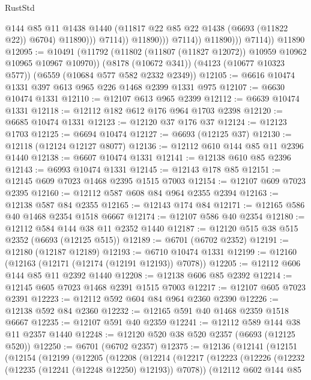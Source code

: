 \begin{lexlean}{RustStd}
\begin{coremodule}
                                  @144
                                  @85
                                  @11
                                  @1438
                                  @1440
                                  (@11817 @22 @85 @22 @1438 (@6693 (@11822 @22)) @6704)
                                  @11890)))
                            @7114))
                        @11890)))
                  @7114))
              @11890)))
        @7114))
    @11890
@12095 := @10491
    (@11792 (@11802 (@11807 (@11827 @12072)) @10959 @10962 @10965 @10967 @10970))
    (@8178 (@10672 @341))
    (@4123 (@10677 @10323 @577))
    (@6559 (@10684 @577 @582 @2332 @2349))
@12105 := @6616 @10474 @1331 @397 @613 @965 @226 @1468 @2399 @1331 @975
@12107 := @6630 @10474 @1331
@12110 := @12107 @613 @965 @2399
@12112 := @6639 @10474 @1331
@12118 := @12112 @182 @612 @176 @964 @1703 @2398
@12120 := @6685 @10474 @1331
@12123 := @12120 @37 @176 @37
@12124 := @12123 @1703
@12125 := @6694 @10474
@12127 := @6693 (@12125 @37)
@12130 := @12118 (@12124 @12127 @8077)
@12136 := @12112 @610 @144 @85 @11 @2396 @1440
@12138 := @6607 @10474 @1331
@12141 := @12138 @610 @85 @2396
@12143 := @6993 @10474 @1331
@12145 := @12143 @178 @85
@12151 := @12145 @609 @7023 @1468 @2395 @1515 @7003
@12154 := @12107 @609 @7023 @2395
@12160 := @12112 @587 @608 @84 @964 @2355 @2394
@12163 := @12138 @587 @84 @2355
@12165 := @12143 @174 @84
@12171 := @12165 @586 @40 @1468 @2354 @1518 @6667
@12174 := @12107 @586 @40 @2354
@12180 := @12112 @584 @144 @38 @11 @2352 @1440
@12187 := @12120 @515 @38 @515 @2352 (@6693 (@12125 @515))
@12189 := @6701 (@6702 @2352)
@12191 := @12180 (@12187 @12189)
@12193 := @6710 @10474 @1331
@12199 := @12160 (@12163 (@12171 (@12174 (@12191 @12193)) @7078))
@12205 := @12112 @606 @144 @85 @11 @2392 @1440
@12208 := @12138 @606 @85 @2392
@12214 := @12145 @605 @7023 @1468 @2391 @1515 @7003
@12217 := @12107 @605 @7023 @2391
@12223 := @12112 @592 @604 @84 @964 @2360 @2390
@12226 := @12138 @592 @84 @2360
@12232 := @12165 @591 @40 @1468 @2359 @1518 @6667
@12235 := @12107 @591 @40 @2359
@12241 := @12112 @589 @144 @38 @11 @2357 @1440
@12248 := @12120 @520 @38 @520 @2357 (@6693 (@12125 @520))
@12250 := @6701 (@6702 @2357)
@12375 := @12136
    (@12141
      (@12151
        (@12154
          (@12199
            (@12205
              (@12208
                (@12214
                  (@12217
                    (@12223
                      (@12226 (@12232 (@12235 (@12241 (@12248 @12250) @12193)) @7078))
                      (@12112
                        @602
                        @144
                        @85

\end{coremodule}
\end{lexlean}
